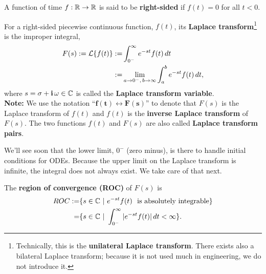 \begin{tcolorbox}[colback=mylightblue, title = {\bf The Laplace Transform}, breakable]
A function of time $f:\mathbb R \to \mathbb R$ is said to be \textbf{right-sided} if $f(t) = 0$ for all $t <0$.

\begin{definition}
\label{def:LaplaceTransform}
 For a right-sided piecewise continuous function, $f(t)$, its \textbf{Laplace transform}\footnote{Technically, this is the \textbf{unilateral Laplace transform}. There exists also a bilateral Laplace transform; because it is not used much in engineering, we do not introduce it.} is the improper integral,
\begin{equation}
\label{eq:UnilateralLaplaceTransform}
\begin{aligned}
    F(s):={\cal L}\{f(t) \}:=& \int_{0^-}^\infty e^{-st} f(t)\, dt \\
    :=& \lim_{a\to 0^-,\, b \to \infty} \int_a^b e^{-st} f(t)\, dt,
\end{aligned}   
\end{equation}
where $s = \sigma + \mathop{\bm{\mathrm i}} \omega \in \mathbb C$ is called the \textbf{Laplace transform variable}. \\

\textbf{Note:} We use the notation 
``$\bm{f(t) \longleftrightarrow  F(s)}$''
to denote that $F(s)$ is the Laplace transform of $f(t)$ and $f(t)$ is the \textbf{inverse Laplace transform} of $F(s)$. The two functions $f(t)$ and $F(s)$ are also called \textbf{Laplace transform pairs}.

\end{definition}

\vspace*{.2cm}
We'll see soon that the lower limit, $0^-$ (zero minus), is there to handle initial conditions for ODEs. Because the upper limit on the Laplace transform is infinite, the integral does not always exist. We take care of that next.

\vspace*{.2cm}

\begin{definition}
\label{def:ROC}
The \textbf{region of convergence (ROC)} of $F(s)$ is
\begin{equation}
\label{eq:ROC}
\begin{aligned}
    ROC:=&\{s \in \mathbb C~|~ e^{-st}f(t)~~ \text{is absolutely integrable} \} \\
    =& \{s \in \mathbb C~|~ \int_{0^-}^\infty |e^{-st}f(t)|\, dt < \infty \}.
\end{aligned}   
\end{equation}


\end{definition}
\end{tcolorbox}
